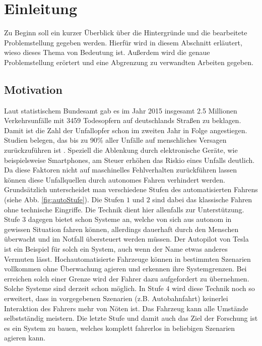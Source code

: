 \chapter{Einleitung}\label{einleitung}
Zu Beginn soll ein kurzer Überblick über die Hintergründe und die bearbeitete Problemstellung gegeben werden.
Hierfür wird in diesem Abschnitt erläutert, wieso dieses Thema von Bedeutung ist. Außerdem wird die genaue Problemstellung erörtert und eine Abgrenzung zu verwandten Arbeiten gegeben.

\section{Motivation}\label{motivation}
Laut statistischem Bundesamt \cite{destatis} gab es im Jahr 2015 insgesamt 2.5 Millionen Verkehrsunfälle mit 3459 Todesopfern auf deutschlands Straßen zu beklagen. Damit ist die Zahl der Unfallopfer schon im zweiten Jahr in Folge angestiegen. Studien belegen, das bis zu 90\% aller Unfälle auf menschliches Versagen zurückzuführen ist \cite{Dingus08032016}. Speziell die Ablenkung durch elektronische Geräte, wie beispielsweise Smartphones, am Steuer erhöhen das Riskio eines Unfalls deutlich.
Da diese Faktoren nicht auf maschinelles Fehlverhalten zurückführen lassen können diese Unfallquellen durch autonomes Fahren verhindert werden.\\
Grundsätzlich unterscheidet man verschiedene Stufen des automatisierten Fahrens (siehe Abb. \ref{fig:autoStufe}).
Die Stufen $1$ und $2$ sind dabei das klassische Fahren ohne technische Eingriffe. Die Technik dient hier allenfalls zur Unterstützung. Stufe $3$ dagegen bietet schon Systeme an, welche von sich aus autonom in gewissen Situation fahren können, allerdings dauerhaft durch den Menschen überwacht und im Notfall übersteuert werden müssen. Der Autopilot von Tesla ist ein Beispiel für solch ein System, auch wenn der Name etwas anderes Vermuten lässt. Hochautomatisierte Fahrzeuge können in bestimmten Szenarien vollkommen ohne Überwachung agieren und erkennen ihre Systemgrenzen. Bei erreichen solch einer Grenze wird der Fahrer dazu aufgefordert zu übernehmen. Solche Systeme sind derzeit schon möglich. In Stufe $4$ wird diese Technik noch so erweitert, dass in vorgegebenen Szenarien (z.B. Autobahnfahrt) keinerlei Interaktion des Fahrers mehr von Nöten ist. Das Fahrzeug kann alle Umstände selbstständig meistern.
Die letzte Stufe und damit auch das Ziel der Forschung ist es ein System zu bauen, welches komplett fahrerlos in beliebigen Szenarien agieren kann.\\
